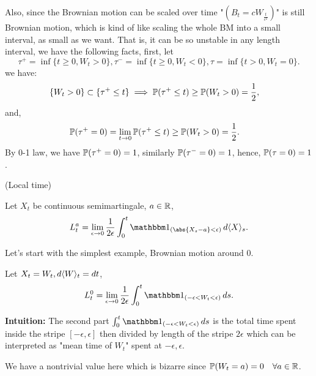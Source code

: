 Also, since the Brownian motion can be scaled over time "$(B_t = cW_{\frac{t}{c^2}})$" is still Brownian motion, which is kind of like scaling the whole BM into a small interval, as small as we want. That is, it can be so unstable in any length interval, we have the following facts, first, let
\begin{equation*}
    \tau^+ = \inf{\{t\geq 0, W_t > 0\}}, \tau^- = \inf{\{t\geq 0, W_t < 0\}}, \tau  = \inf \{t > 0, W_t = 0\}.
\end{equation*} we have:
\begin{align*}
    \{W_t > 0\}\subset \{\tau^+ \leq t\} &\implies \mathbb{P}(\tau^+ \leq t) \geq \mathbb{P}(W_t > 0) = \frac{1}{2},
\end{align*}
and,
\begin{align*}
    \mathbb{P}(\tau^+ = 0) &= \lim\limits_{t\rightarrow 0} \mathbb{P}(\tau^+ \leq t) \geq \mathbb{P}(W_t > 0) =\frac{1}{2}.
\end{align*}
By 0-1 law, we have $\mathbb{P}(\tau^+ = 0) = 1$, similarly $\mathbb{P}(\tau^- = 0) = 1$, hence, $\mathbb{P}(\tau = 0) = 1$.

\begin{dfn}{(Local time)} 

Let $X_t$ be continuous semimartingale, $a\in \mathbb{R}$,
\begin{equation*}
    L_t^a = \lim_{\epsilon\rightarrow 0} \frac{1}{2\epsilon} \int_0^t \I{(\abs{X_s -a}< \epsilon)} \diff \qvar{X}{s}.
\end{equation*}
\end{dfn}

Let's start with the simplest example, Brownian motion around $0$.

\begin{example}
Let $X_t = W_t, \mathop{}\!d \langle{W} \rangle_{t}= \mathop{}\!d t$,
\begin{equation*}
    L_t^0 = \lim_{\epsilon\rightarrow 0} \frac{1}{2\epsilon} \int_0^t \I{(-\epsilon <W_t<\epsilon)} \diff s.
\end{equation*}

\textbf{Intuition:} The second part $\int_0^t \I{(-\epsilon <W_t<\epsilon)} \diff s$ is the total time spent inside the stripe $[-\epsilon, \epsilon]$ then divided by length of the stripe $2\epsilon $ which can be interpreted as "mean time of $W_t$" spent at $-\epsilon, \epsilon$.
\end{example}

\begin{rem}
We have a nontrivial value here which is bizarre since $\mathbb{P}(W_t = a) = 0 \quad \forall a\in \mathbb{R}$.
\end{rem}

